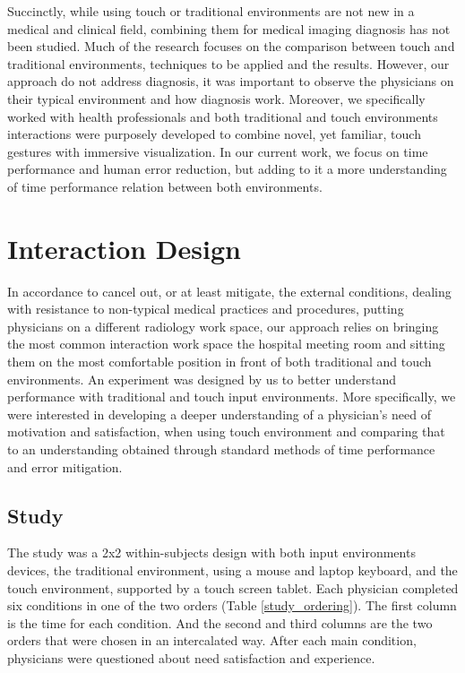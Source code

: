 \documentclass{sigchi}
\begin{document}
Succinctly, while using touch or traditional environments are not new in a medical and clinical field, combining them for medical imaging diagnosis has not been studied. Much of the research focuses on the comparison between touch and traditional environments, techniques to be applied and the results. However, our approach do not address diagnosis, it was important to observe the physicians on their typical environment and how diagnosis work. Moreover, we specifically worked with health professionals and both traditional and touch environments interactions were purposely developed to combine novel, yet familiar, touch gestures with immersive visualization. In our current work, we focus on time performance and human error reduction, but adding to it a more understanding of time performance relation between both environments.

\vfill\null

\section{Interaction Design}

In accordance to cancel out, or at least mitigate, the external conditions, dealing with resistance to non-typical medical practices and procedures, putting physicians on a different radiology work space, our approach relies on bringing the most common interaction work space the hospital meeting room and sitting them on the most comfortable position in front of both traditional and touch environments. An experiment was designed by us to better understand performance with traditional and touch input environments. More specifically, we were interested in developing a deeper understanding of a physician's need of motivation and satisfaction, when using touch environment and comparing that to an understanding obtained through standard methods of time performance and error mitigation.

\subsection{Study}

The study was a 2x2 within-subjects design with both input environments devices, the traditional environment, using a mouse and laptop keyboard, and the touch environment, supported by a touch screen tablet. Each physician completed six conditions in one of the two orders (Table \ref{study_ordering}). The first column is the time for each condition. And the second and third columns are the two orders that were chosen in an intercalated way. After each main condition, physicians were questioned about need satisfaction and experience.
\end{document}
